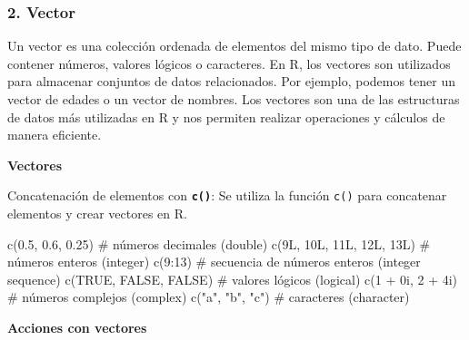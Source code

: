 \documentclass[
  letterpaper,
  DIV=11,
  numbers=noendperiod]{scrartcl}
\newenvironment{Shaded}{}{}
\newcommand{\CommentTok}[1]{\textcolor[rgb]{0.42,0.45,0.49}{#1}}
\newcommand{\ConstantTok}[1]{\textcolor[rgb]{0.00,0.36,0.77}{#1}}
\newcommand{\DecValTok}[1]{\textcolor[rgb]{0.00,0.36,0.77}{#1}}
\newcommand{\FloatTok}[1]{\textcolor[rgb]{0.00,0.36,0.77}{#1}}
\newcommand{\FunctionTok}[1]{\textcolor[rgb]{0.44,0.26,0.76}{#1}}
\newcommand{\NormalTok}[1]{\textcolor[rgb]{0.14,0.16,0.18}{#1}}
\newcommand{\SpecialCharTok}[1]{\textcolor[rgb]{0.00,0.36,0.77}{#1}}
\newcommand{\StringTok}[1]{\textcolor[rgb]{0.01,0.18,0.38}{#1}}
\begin{document}
\hypertarget{vector}{%
\subsubsection{2. Vector}\label{vector}}

Un vector es una colección ordenada de elementos del mismo tipo de dato.
Puede contener números, valores lógicos o caracteres. En R, los vectores
son utilizados para almacenar conjuntos de datos relacionados. Por
ejemplo, podemos tener un vector de edades o un vector de nombres. Los
vectores son una de las estructuras de datos más utilizadas en R y nos
permiten realizar operaciones y cálculos de manera eficiente.

\textbf{Vectores}

Concatenación de elementos con \textbf{\texttt{c()}}: Se utiliza la
función \texttt{c()} para concatenar elementos y crear vectores en R.

\begin{Shaded}
\begin{Highlighting}[]
\FunctionTok{c}\NormalTok{(}\FloatTok{0.5}\NormalTok{, }\FloatTok{0.6}\NormalTok{, }\FloatTok{0.25}\NormalTok{) }\CommentTok{\# números decimales (double)}
\FunctionTok{c}\NormalTok{(9L, 10L, 11L, 12L, 13L) }\CommentTok{\# números enteros (integer)}
\FunctionTok{c}\NormalTok{(}\DecValTok{9}\SpecialCharTok{:}\DecValTok{13}\NormalTok{) }\CommentTok{\# secuencia de números enteros (integer sequence)}
\FunctionTok{c}\NormalTok{(}\ConstantTok{TRUE}\NormalTok{, }\ConstantTok{FALSE}\NormalTok{, }\ConstantTok{FALSE}\NormalTok{) }\CommentTok{\# valores lógicos (logical)}
\FunctionTok{c}\NormalTok{(}\DecValTok{1} \SpecialCharTok{+}\NormalTok{ 0i, }\DecValTok{2} \SpecialCharTok{+}\NormalTok{ 4i) }\CommentTok{\# números complejos (complex)}
\FunctionTok{c}\NormalTok{(}\StringTok{"a"}\NormalTok{, }\StringTok{"b"}\NormalTok{, }\StringTok{"c"}\NormalTok{) }\CommentTok{\# caracteres (character)}
\end{Highlighting}
\end{Shaded}

\textbf{Acciones con vectores}
\end{document}
